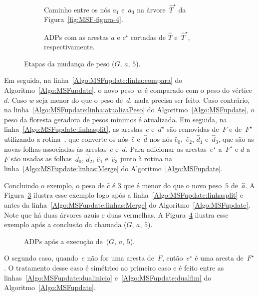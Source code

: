 \begin{figure}[!h]
\begin{subfigure}{.3\textwidth}
\scalebox{.8}{

}
\caption{Caminho entre os nós $a_1$ e~$a_3$ na árvore~$\hat T^\star$ da Figura~\ref{fig:MSF-figura-4}.}
\label{fig:MSF-figura-5}
\end{subfigure}
\hspace{1cm}
\begin{subfigure}{.6\textwidth}
\scalebox{.8}{

}
\caption{ADPs com as arestas $a$ e $c^\star$ cortadas de $\hat T$ e~$\hat T^\star$, respectivamente.}
\label{fig:MSF-figura-6}
\end{subfigure}
\caption{Etapas da mudança de peso \MSFupdate($G$, $a$, $5$).}
\end{figure}

Em seguida, na linha~\ref{Algo:MSFupdate:linha:compara} do Algoritmo~\ref{Algo:MSFupdate}, o novo peso~$w$ é comparado com o peso do vértice~$d$.
Caso $w$ seja menor do que o peso de~$d$, nada precisa ser feito.
Caso contrário, na linha~\ref{Algo:MSFupdate:linha:atualizaPeso} do Algoritmo~\ref{Algo:MSFupdate}, o peso da floresta geradora de pesos mínimos é atualizada.
Em seguida, na linha~\ref{Algo:MSFupdate:linhasplit}, as arestas~$e$ e~$d^\star$ são removidas de~$F$ e de~$F^\star$ utilizando a rotina~\LCOSplit{}, que converte os nós~$\hat e$ e~$\hat d$ nos nós $\hat e_0$,~$\hat e_2$, $\hat d_1$ e~$\hat d_3$, que são as novas folhas associadas às arestas~$e$ e~$d$.
Para adicionar as arestas~$e^\star$ a~$F^\star$ e $d$ a~$F$ são usadas as folhas~$\hat d_0$, $\hat d_2$, $\hat e_1$ e~$\hat e_3$ junto à rotina \LCOMerge{} na linha~\ref{Algo:MSFupdate:linhas:Merge} do Algoritmo~\ref{Algo:MSFupdate}.

Concluindo o exemplo, o peso de $\hat c$ é $3$ que é menor do que o novo peso~$5$ de~$\hat a$.
A Figura~\ref{fig:MSF-figura-6} ilustra esse exemplo logo após a linha~\ref{Algo:MSFupdate:linhasplit} e antes da linha~\ref{Algo:MSFupdate:linhas:Merge} do Algoritmo~\ref{Algo:MSFupdate}.
Note que há duas árvores azuis e duas vermelhas.
A Figura~\ref{fig:MSF-figura-7} ilustra esse exemplo após a conclusão da chamada \MSFupdate($G$, $a$, $5$).

\begin{figure}[htb]
\scalebox{1}{
\centering

}
\caption{ADPs após a execução de~\MSFupdate($G$, $a$, $5$).}
\label{fig:MSF-figura-7}
\end{figure}

O segundo caso, quando~$e$ não for uma aresta de~$F$, então~$e^\star$ é uma aresta de~$F^\star$.
O tratamento desse caso é simétrico ao primeiro caso e é feito entre as linhas~\ref{Algo:MSFupdate:dualinicio} e~\ref{Algo:MSFupdate:dualfim} do Algoritmo~\ref{Algo:MSFupdate}.

